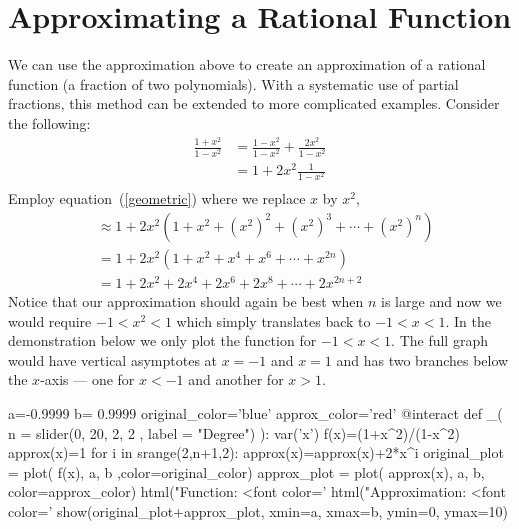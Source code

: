 \documentclass[12pt]{article}
\begin{document}
\section{Approximating a Rational Function}
%
We can use the approximation above to create an approximation of a rational function (a fraction of two polynomials).  With a systematic use of partial fractions, this method can be extended to more complicated examples.  Consider the following:
%
\begin{align*}
\frac{1+x^2}{1-x^2}
&=\frac{1-x^2}{1-x^2}+\frac{2x^2}{1-x^2}\\
&=1+2x^2\frac{1}{1-x^2}\\
\end{align*}
%
Employ equation~(\ref{geometric}) where we replace $x$ by $x^2$,
%
\begin{align*}
&\approx 1+2x^2\left(1+x^2+(x^2)^2+(x^2)^3+\cdots+(x^2)^n\right)\\
&=1+2x^2\left(1+x^2+x^4+x^6+\cdots+x^{2n}\right)\\
&=1+2x^2+2x^4+2x^6+2x^8+\cdots+2x^{2n+2}
\end{align*}
%
Notice that our approximation should again be best when $n$ is large and now we would require $-1<x^2<1$ which simply translates back to $-1<x<1$.  In the demonstration below we only plot the function for $-1<x<1$.  The full graph would have vertical asymptotes at $x=-1$ and $x=1$ and has two branches below the $x$-axis --- one for $x<-1$ and another for $x>1$.
%
\begin{sageverbatim}
a=-0.9999
b= 0.9999
original_color='blue'
approx_color='red'
@interact
def _( n = slider(0, 20, 2, 2 , label = "Degree") ):
    var('x')
    f(x)=(1+x^2)/(1-x^2)
    approx(x)=1
    for i in srange(2,n+1,2):
        approx(x)=approx(x)+2*x^i
    original_plot = plot( f(x), a, b ,color=original_color)
    approx_plot = plot( approx(x),  a, b, color=approx_color)
    html("Function: <font color='%
    html("Approximation: <font color='%
    show(original_plot+approx_plot, xmin=a, xmax=b, ymin=0, ymax=10)
\end{sageverbatim}
%
%
\end{document}
